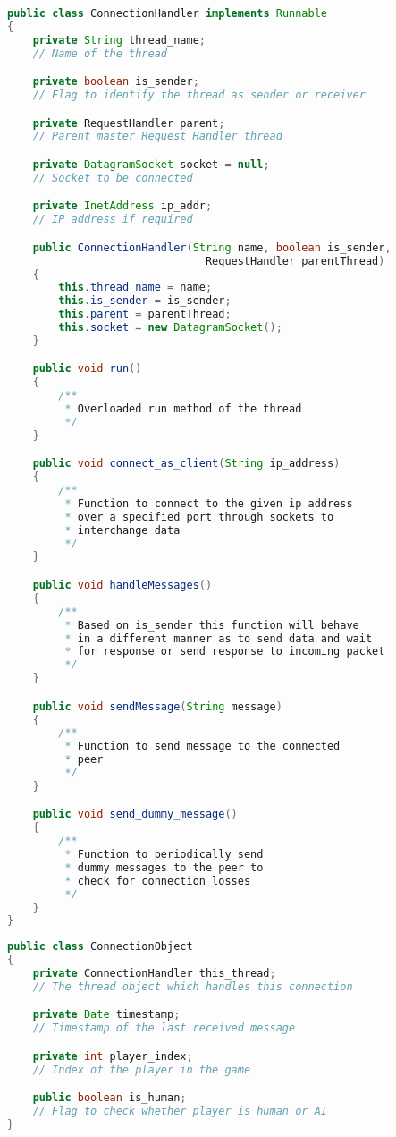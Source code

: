 \documentclass{article}
\begin{document}
\begin{lstlisting}[language=Java, caption={Class Parameters for Connection Handler Class}]
public class ConnectionHandler implements Runnable
{
	private String thread_name; 
	// Name of the thread

	private boolean is_sender; 
	// Flag to identify the thread as sender or receiver

	private RequestHandler parent; 
	// Parent master Request Handler thread

	private DatagramSocket socket = null; 
	// Socket to be connected

	private InetAddress ip_addr; 
	// IP address if required

	public ConnectionHandler(String name, boolean is_sender,
	                           RequestHandler parentThread)
	{
		this.thread_name = name;
		this.is_sender = is_sender;
		this.parent = parentThread;
		this.socket = new DatagramSocket();
	}

	public void run()
	{
		/**
		 * Overloaded run method of the thread
		 */
	}

	public void connect_as_client(String ip_address)
	{
		/**
		 * Function to connect to the given ip address
		 * over a specified port through sockets to 
		 * interchange data
		 */
	}

	public void handleMessages()
	{
		/**
		 * Based on is_sender this function will behave
		 * in a different manner as to send data and wait
		 * for response or send response to incoming packet
		 */
	}

	public void sendMessage(String message)
	{
		/**
		 * Function to send message to the connected 
		 * peer
		 */
	}

	public void send_dummy_message()
	{
		/**
		 * Function to periodically send
		 * dummy messages to the peer to
		 * check for connection losses
		 */
	}
}

\end{lstlisting}

\begin{lstlisting}[language=Java, caption={Class Parameters for Connection Object Class}]
public class ConnectionObject
{
	private ConnectionHandler this_thread; 
	// The thread object which handles this connection

	private Date timestamp; 
	// Timestamp of the last received message

	private int player_index; 
	// Index of the player in the game

	public boolean is_human;
	// Flag to check whether player is human or AI
}
\end{lstlisting}
\end{document}
